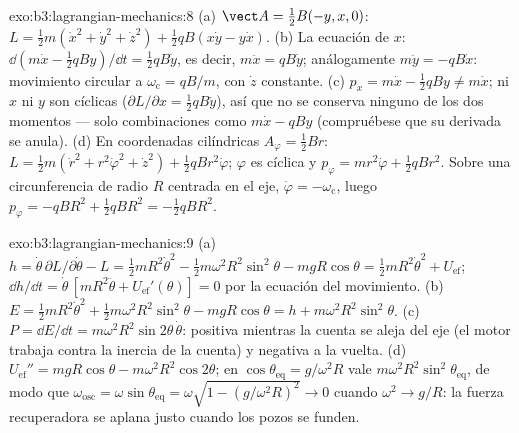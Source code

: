 \begin{solution}{exo:b3:lagrangian-mechanics:8}
(a) $\vect A = \tfrac12 B(-y, x, 0)$:
$L = \tfrac12 m(\dot x^2 + \dot y^2 + \dot z^2) + \tfrac12 qB(x\dot y -
y\dot x)$. (b) La ecuación de $x$: $\dd(m\dot x - \tfrac12 qBy)/\dd t =
\tfrac12 qB\dot y$, es decir, $m\ddot x = qB\dot y$; análogamente $m\ddot y =
-qB\dot x$: movimiento circular a $\omega_{\text{c}} = qB/m$, con $\dot z$
constante. (c) $p_x = m\dot x - \tfrac12 qBy \neq m\dot x$; ni $x$
ni $y$ son cíclicas ($\partial L/\partial x = \tfrac12 qB\dot y$), así que
no se conserva ninguno de los dos momentos --- solo combinaciones como $m\dot x -
qBy$ (compruébese que su derivada se anula). (d) En coordenadas cilíndricas
$A_\varphi = \tfrac12 Br$:
$L = \tfrac12 m(\dot r^2 + r^2\dot\varphi^2 + \dot z^2) + \tfrac12
qBr^2\dot\varphi$; $\varphi$ es cíclica y $p_\varphi = mr^2\dot\varphi +
\tfrac12 qBr^2$. Sobre una circunferencia de radio $R$ centrada en el eje,
$\dot\varphi = -\omega_{\text{c}}$, luego $p_\varphi = -qBR^2 + \tfrac12
qBR^2 = -\tfrac12 qBR^2$.
\end{solution}

\begin{solution}{exo:b3:lagrangian-mechanics:9}
(a) $h = \dot\theta\,\partial L/\partial\dot\theta - L = \tfrac12
mR^2\dot\theta^2 - \tfrac12 m\omega^2R^2\sin^2\theta - mgR\cos\theta =
\tfrac12 mR^2\dot\theta^2 + U_{\text{ef}}$; $\dd h/\dd t =
\dot\theta\,[mR^2\ddot\theta + U_{\text{ef}}'(\theta)] = 0$ por la
ecuación del movimiento. (b) $E = \tfrac12 mR^2\dot\theta^2 + \tfrac12
m\omega^2R^2\sin^2\theta - mgR\cos\theta = h +
m\omega^2R^2\sin^2\theta$. (c) $P = \dd E/\dd t =
m\omega^2R^2\sin2\theta\,\dot\theta$: positiva mientras la cuenta se aleja
del eje (el motor trabaja contra la inercia de la cuenta) y negativa a la
vuelta. (d) $U_{\text{ef}}'' = mgR\cos\theta -
m\omega^2R^2\cos2\theta$; en $\cos\theta_{\text{eq}} = g/\omega^2R$ vale
$m\omega^2R^2\sin^2\theta_{\text{eq}}$, de modo que
$\omega_{\text{osc}} = \omega\sin\theta_{\text{eq}} = \omega\sqrt{1 -
(g/\omega^2R)^2} \to 0$ cuando $\omega^2 \to g/R$: la fuerza recuperadora
se aplana justo cuando los pozos se funden.
\end{solution}

